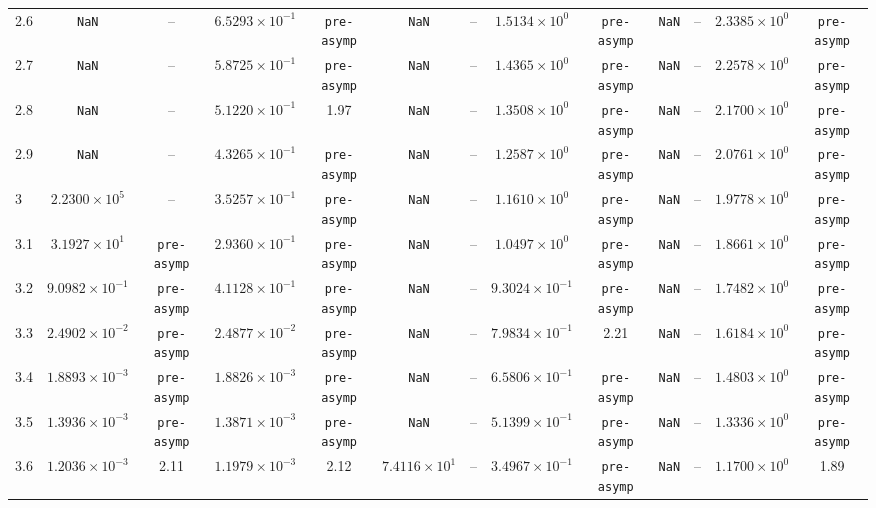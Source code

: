 \begin{table}
{\begin{tabular}{l cc cc cc cc cc cc}
2.6 & \texttt{NaN} & -- & $6.5293\times10^{-1}$ & \texttt{pre-asymp} & \texttt{NaN} & -- & $1.5134\times10^{0}$ & \texttt{pre-asymp} & \texttt{NaN} & -- & $2.3385\times10^{0}$ & \texttt{pre-asymp} \\
2.7 & \texttt{NaN} & -- & $5.8725\times10^{-1}$ & \texttt{pre-asymp} & \texttt{NaN} & -- & $1.4365\times10^{0}$ & \texttt{pre-asymp} & \texttt{NaN} & -- & $2.2578\times10^{0}$ & \texttt{pre-asymp} \\
2.8 & \texttt{NaN} & -- & $5.1220\times10^{-1}$ & 1.97 & \texttt{NaN} & -- & $1.3508\times10^{0}$ & \texttt{pre-asymp} & \texttt{NaN} & -- & $2.1700\times10^{0}$ & \texttt{pre-asymp} \\
2.9 & \texttt{NaN} & -- & $4.3265\times10^{-1}$ & \texttt{pre-asymp} & \texttt{NaN} & -- & $1.2587\times10^{0}$ & \texttt{pre-asymp} & \texttt{NaN} & -- & $2.0761\times10^{0}$ & \texttt{pre-asymp} \\
3 & $2.2300\times10^{5}$ & -- & $3.5257\times10^{-1}$ & \texttt{pre-asymp} & \texttt{NaN} & -- & $1.1610\times10^{0}$ & \texttt{pre-asymp} & \texttt{NaN} & -- & $1.9778\times10^{0}$ & \texttt{pre-asymp} \\
3.1 & $3.1927\times10^{1}$ & \texttt{pre-asymp} & $2.9360\times10^{-1}$ & \texttt{pre-asymp} & \texttt{NaN} & -- & $1.0497\times10^{0}$ & \texttt{pre-asymp} & \texttt{NaN} & -- & $1.8661\times10^{0}$ & \texttt{pre-asymp} \\
3.2 & $9.0982\times10^{-1}$ & \texttt{pre-asymp} & $4.1128\times10^{-1}$ & \texttt{pre-asymp} & \texttt{NaN} & -- & $9.3024\times10^{-1}$ & \texttt{pre-asymp} & \texttt{NaN} & -- & $1.7482\times10^{0}$ & \texttt{pre-asymp} \\
3.3 & $2.4902\times10^{-2}$ & \texttt{pre-asymp} & $2.4877\times10^{-2}$ & \texttt{pre-asymp} & \texttt{NaN} & -- & $7.9834\times10^{-1}$ & 2.21 & \texttt{NaN} & -- & $1.6184\times10^{0}$ & \texttt{pre-asymp} \\
3.4 & $1.8893\times10^{-3}$ & \texttt{pre-asymp} & $1.8826\times10^{-3}$ & \texttt{pre-asymp} & \texttt{NaN} & -- & $6.5806\times10^{-1}$ & \texttt{pre-asymp} & \texttt{NaN} & -- & $1.4803\times10^{0}$ & \texttt{pre-asymp} \\
3.5 & $1.3936\times10^{-3}$ & \texttt{pre-asymp} & $1.3871\times10^{-3}$ & \texttt{pre-asymp} & \texttt{NaN} & -- & $5.1399\times10^{-1}$ & \texttt{pre-asymp} & \texttt{NaN} & -- & $1.3336\times10^{0}$ & \texttt{pre-asymp} \\
3.6 & $1.2036\times10^{-3}$ & 2.11 & $1.1979\times10^{-3}$ & 2.12 & $7.4116\times10^{1}$ & -- & $3.4967\times10^{-1}$ & \texttt{pre-asymp} & \texttt{NaN} & -- & $1.1700\times10^{0}$ & 1.89 \\

\end{tabular}}
\end{table}

